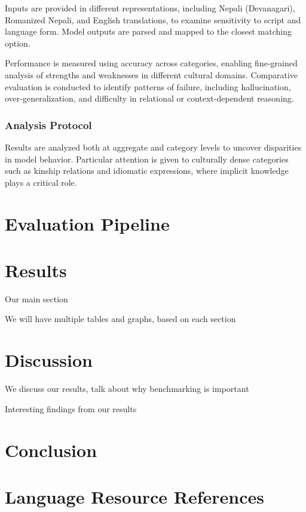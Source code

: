 \documentclass[10pt, a4paper]{article}
\begin{document}
Inputs are provided in different representations, including Nepali (Devanagari), Romanized Nepali, and English translations, to examine sensitivity to script and language form. Model outputs are parsed and mapped to the closest matching option.

Performance is measured using accuracy across categories, enabling fine-grained analysis of strengths and weaknesses in different cultural domains. Comparative evaluation is conducted to identify patterns of failure, including hallucination, over-generalization, and difficulty in relational or context-dependent reasoning.

\subsubsection{Analysis Protocol}
Results are analyzed both at aggregate and category levels to uncover disparities in model behavior. Particular attention is given to culturally dense categories such as kinship relations and idiomatic expressions, where implicit knowledge plays a critical role.

\section{Evaluation Pipeline}

\section{Results}
Our main section

We will have multiple tables and graphs, based on each section

\section{Discussion}
We discuss our results, talk about why benchmarking is important

Interesting findings from our results

\section{Conclusion}




\section{Language Resource References}
\label{lr:ref}
\end{document}
